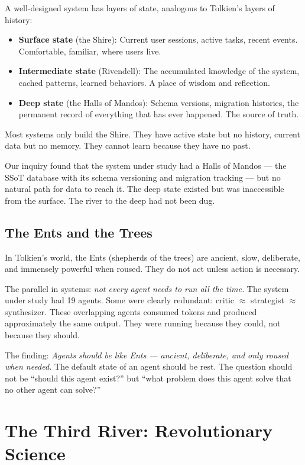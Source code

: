 \documentclass[12pt,a4paper,oneside]{book}
\begin{document}
A well-designed system has layers of state, analogous to Tolkien's layers of history:
\begin{itemize}
  \item \textbf{Surface state} (the Shire): Current user sessions, active tasks, recent events. Comfortable, familiar, where users live.
  \item \textbf{Intermediate state} (Rivendell): The accumulated knowledge of the system, cached patterns, learned behaviors. A place of wisdom and reflection.
  \item \textbf{Deep state} (the Halls of Mandos): Schema versions, migration histories, the permanent record of everything that has ever happened. The source of truth.
\end{itemize}

Most systems only build the Shire. They have active state but no history, current data but no memory. They cannot learn because they have no past.

Our inquiry found that the system under study had a Halls of Mandos --- the SSoT database with its schema versioning and migration tracking --- but no natural path for data to reach it. The deep state existed but was inaccessible from the surface. The river to the deep had not been dug.

\section{The Ents and the Trees}

In Tolkien's world, the Ents (shepherds of the trees) are ancient, slow, deliberate, and immensely powerful when roused. They do not act unless action is necessary.

The parallel in systems: \emph{not every agent needs to run all the time.} The system under study had 19 agents. Some were clearly redundant: critic $\approx$ strategist $\approx$ synthesizer. These overlapping agents consumed tokens and produced approximately the same output. They were running because they could, not because they should.

The finding: \emph{Agents should be like Ents --- ancient, deliberate, and only roused when needed.} The default state of an agent should be rest. The question should not be \enquote{should this agent exist?} but \enquote{what problem does this agent solve that no other agent can solve?}

\chapter{The Third River: Revolutionary Science}
\end{document}
